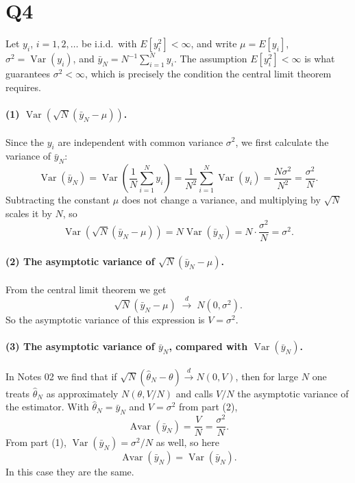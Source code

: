 \documentclass[11pt]{article}
\DeclareMathOperator{\Var}{Var}
\DeclareMathOperator{\Avar}{Avar}
\begin{document}
\section{Q4}
\label{sec:q4}

Let $y_i$, $i = 1,2,\dots$ be i.i.d.\ with $E[y_i^2] < \infty$, and write
$\mu = E[y_i]$, $\sigma^2 = \Var(y_i)$, and
$\bar{y}_N = N^{-1}\sum_{i=1}^{N} y_i$. The assumption $E[y_i^2] < \infty$ is
what guarantees $\sigma^2 < \infty$, which is precisely the condition the
central limit theorem requires.

\paragraph{(1) $\Var\!\left(\sqrt{N}(\bar{y}_N - \mu)\right)$.}
Since the $y_i$ are independent with common variance $\sigma^2$, we first calculate the variance of $\bar{y}_N$:
\[
\Var(\bar{y}_N) = \Var\!\left(\frac{1}{N}\sum_{i=1}^{N} y_i\right)
= \frac{1}{N^2}\sum_{i=1}^{N}\Var(y_i)
= \frac{N\sigma^2}{N^2} = \frac{\sigma^2}{N}.
\]
Subtracting the constant $\mu$ does not change a variance, and multiplying by
$\sqrt{N}$ scales it by $N$, so
\[
\Var\!\left(\sqrt{N}(\bar{y}_N - \mu)\right) = N\Var(\bar{y}_N)
= N\cdot\frac{\sigma^2}{N} = \sigma^2 .
\]

\paragraph{(2) The asymptotic variance of $\sqrt{N}(\bar{y}_N - \mu)$.}
From the central limit theorem we get
\[
\sqrt{N}(\bar{y}_N - \mu) \;\xrightarrow{\;d\;}\; N(0,\sigma^2).
\]
So the asymptotic variance of this expression is $V = \sigma^2$.

\paragraph{(3) The asymptotic variance of $\bar{y}_N$, compared with
$\Var(\bar{y}_N)$.}
In Notes 02 we find that if $\sqrt{N}(\hat{\theta}_N - \theta)
\xrightarrow{d} N(0,V)$, then for large $N$ one treats $\hat\theta_N$ as
approximately $N(\theta, V/N)$ and calls $V/N$ the asymptotic variance of the
estimator. With $\hat\theta_N = \bar{y}_N$ and $V = \sigma^2$ from part (2),
\[
\Avar(\bar{y}_N) = \frac{V}{N} = \frac{\sigma^2}{N}.
\]
From part (1), $\Var(\bar{y}_N) = \sigma^2/N$ as well, so here
\[
\Avar(\bar{y}_N) = \Var(\bar{y}_N).
\]
In this case they are the same.
\end{document}
